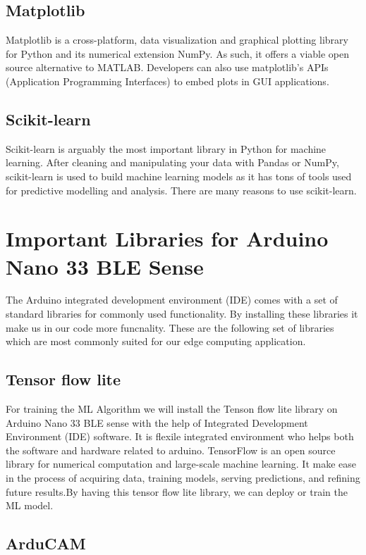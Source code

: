 {\subsection{Matplotlib}
Matplotlib is a cross-platform, data visualization and graphical plotting library for Python and its numerical extension NumPy. As such, it offers a viable open source alternative to MATLAB. Developers can also use matplotlib's APIs (Application Programming Interfaces) to embed plots in GUI applications.
\subsection{Scikit-learn}
Scikit-learn is arguably the most important library in Python for machine learning. After cleaning and manipulating your data with Pandas or NumPy, scikit-learn is used to build machine learning models as it has tons of tools used for predictive modelling and analysis. There are many reasons to use scikit-learn.

\section{Important Libraries for Arduino Nano 33 BLE Sense}

The Arduino integrated development environment (IDE) comes with a set of standard libraries for commonly used functionality. By installing these libraries it make us in our code more funcnality. These are the following set of libraries which are most commonly suited for our edge computing application.

\subsection{Tensor flow lite}

For training the ML Algorithm we will install the Tenson flow lite library on Arduino Nano 33 BLE sense with the help of Integrated Development Environment (IDE) software. It is flexile integrated environment who helps both the software and hardware related to arduino. TensorFlow is an open source library for numerical computation and large-scale machine learning. It make ease in the process of acquiring data, training models, serving predictions, and refining future results.By having this tensor flow lite library, we can deploy or train the ML model. 

\subsection{ArduCAM}

}

